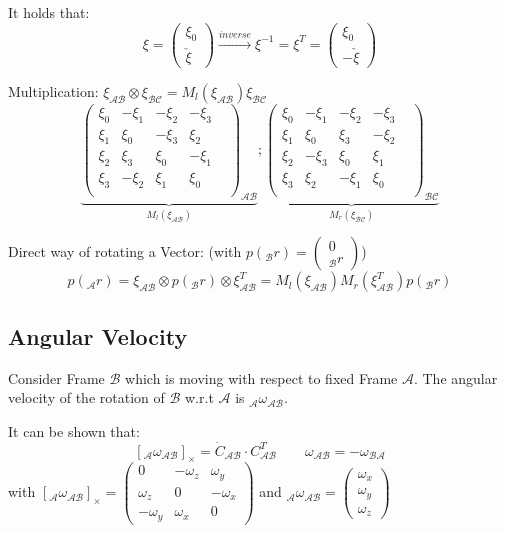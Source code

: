 \documentclass[fontsize=6pt,DIV=calc,a4paper,ngerman]{scrartcl}
\begin{document}
\begin{multicols*}{4}
	It holds that:
	$$\xi = \begin{pmatrix}\xi_0 \\ \check{\xi}\end{pmatrix} \xrightarrow[]{inverse} \xi^{-1} = \xi^T =\begin{pmatrix}\xi_0 \\ -\check{\xi}\end{pmatrix}$$

	Multiplication: $ \xi_\mathcal{AB}\otimes \xi_\mathcal{BC} = M_l(\xi_\mathcal{AB}) \xi_\mathcal{BC}$
	$$
		\underbrace{\left(\begin{smallmatrix}
					\xi_0 & -\xi_1 & -\xi_2 & -\xi_3 \\
					\xi_1 & \xi_0 & -\xi_3 & \xi_2 \\
					\xi_2 & \xi_3 & \xi_0 & -\xi_1 \\
					\xi_3 & -\xi_2 & \xi_1 & \xi_0 & \\
				\end{smallmatrix}\right)_\mathcal{AB} }_{M_l(\xi_\mathcal{AB})}
		;
		\underbrace{\left(\begin{smallmatrix}
					\xi_0 & -\xi_1 & -\xi_2 & -\xi_3 \\
					\xi_1 & \xi_0 & \xi_3 & -\xi_2 \\
					\xi_2 & -\xi_3 & \xi_0 & \xi_1 \\
					\xi_3 & \xi_2 & -\xi_1 & \xi_0 & \\
				\end{smallmatrix}\right)_\mathcal{BC} }_{M_r(\xi_\mathcal{BC})}
	$$

	\smallskip
	Direct way of rotating a Vector: (with $p({}_\mathcal{B}r)= \left(\begin{smallmatrix} 0 \\ {}_\mathcal{B}r\end{smallmatrix}\right)$)
	$$p({}_\mathcal{A}r)
		=\xi_\mathcal{AB} \otimes p({}_\mathcal{B}r) \otimes \xi^T_\mathcal{AB}
		=M_l(\xi_\mathcal{AB})M_r(\xi_\mathcal{AB}^T)p({}_\mathcal{B}r)$$

	\subsection{Angular Velocity}
	Consider Frame $\mathcal{B}$ which is moving with respect to fixed Frame $\mathcal{A}$. The angular velocity of the rotation of $\mathcal{B}$ w.r.t $\mathcal{A}$ is ${}_\mathcal{A}\omega_\mathcal{AB}$.

	It can be shown that: $$ [{}_\mathcal{A}\omega_\mathcal{AB}]_\times=\dot{C}_\mathcal{AB}\cdot C_\mathcal{AB}^T \qquad \omega_\mathcal{AB} = -\omega_\mathcal{BA}$$
	with $ [{}_\mathcal{A}\omega_\mathcal{AB}]_\times =
		\left(\begin{smallmatrix}
				0 & -\omega_z & \omega_y \\
				\omega_z & 0 & -\omega_x \\
				-\omega_y & \omega_x & 0
			\end{smallmatrix}\right)
	$ and ${}_\mathcal{A}\omega_\mathcal{AB}=\begin{pmatrix}\omega_x \\ \omega_y\\\omega_z	\end{pmatrix}$


\end{multicols*}
\end{document}
